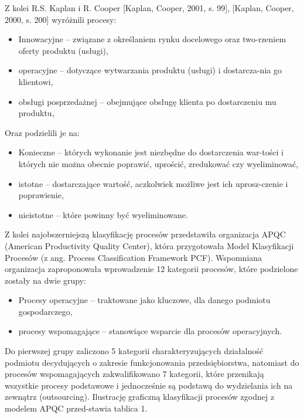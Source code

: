 \documentclass[a4paper, 12pt]{article}
\begin{document}
\hspace*{1 cm} Z  kolei  R.S.  Kaplan  i  R.  Cooper  [Kaplan,  Cooper,  2001, s.  99],  [Kaplan, Cooper, 2000, s. 200] wyróżnili procesy:
\begin{itemize}
	\item Innowacyjne – związane z określaniem rynku docelowego oraz two-rzeniem oferty produktu (usługi), 
	\item operacyjne  –  dotyczące  wytwarzania  produktu  (usługi)  i  dostarcza-nia go klientowi,
	\item obsługi posprzedażnej – obejmujące obsługę klienta po dostarczeniu mu produktu,
\end{itemize}
\hspace*{1 cm} Oraz podzielili je na:
\begin{itemize}
	\item Konieczne – których wykonanie jest niezbędne do dostarczenia war-tości  i  których  nie  można  obecnie  poprawić,  uprościć,  zredukować czy wyeliminować, 
	\item istotne – dostarczające wartość, aczkolwiek możliwe jest ich uprosz-czenie i poprawienie,
	\item nieistotne – które powinny być wyeliminowane. 
\end{itemize}
\hspace*{1 cm} Z kolei najobszerniejszą klasyfikację procesów przedstawiła organizacja APQC (American Productivity Quality Center), która przygotowała Model Klasyfikacji Procesów (z ang. Process Classification Framework PCF). Wspomniana  organizacja  zaproponowała  wprowadzenie  12  kategorii procesów, które podzielone zostały na dwie grupy:
\begin{itemize}
	\item Procesy  operacyjne  –  traktowane  jako  kluczowe,  dla  danego  podmiotu gospodarczego, 
	\item procesy  wspomagające  –  stanowiące  wsparcie  dla  procesów  operacyjnych.
\end{itemize}
\hspace*{1 cm} Do  pierwszej  grupy  zaliczono  5  kategorii  charakteryzujących  działalność  podmiotu  decydujących  o  zakresie  funkcjonowania przedsiębiorstwa,  natomiast  do  procesów  wspomagających  zakwalifikowano  7 kategorii,  które  przenikają  wszystkie  procesy  podstawowe  i  jednocześnie są podstawą do wydzielania ich na zewnątrz (outsourcing). Ilustrację  graficzną  klasyfikacji  procesów  zgodnej  z  modelem  APQC  przed-stawia tablica 1.
\end{document}
